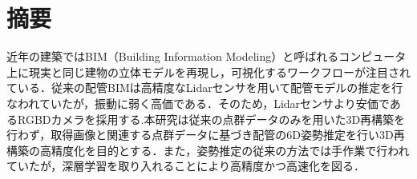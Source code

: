 \section*{%
摘要}

近年の建築ではBIM（Building Information Modeling）と呼ばれるコンピュータ上に現実と同じ建物の立体モデルを再現し，可視化するワークフローが注目されている．従来の配管BIMは高精度なLidarセンサを用いて配管モデルの推定を行なわれていたが，振動に弱く高価である．そのため，Lidarセンサより安価であるRGBDカメラを採用する.本研究は従来の点群データのみを用いた3D再構築を行わず，取得画像と関連する点群データに基づき配管の6D姿勢推定を行い3D再構築の高精度化を目的とする．また，姿勢推定の従来の方法では手作業で行われていたが，深層学習を取り入れることにより高精度かつ高速化を図る．